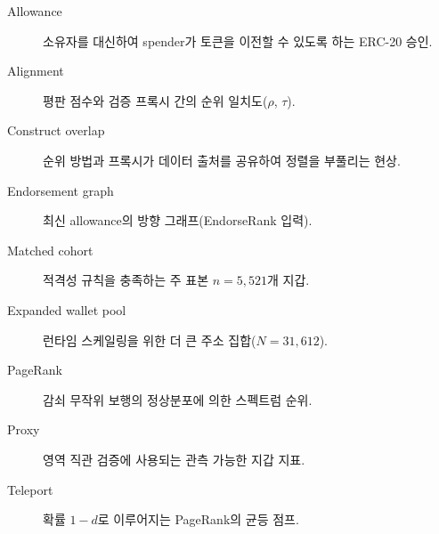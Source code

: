 
\begin{description}
\item[Allowance] 소유자를 대신하여 spender가 토큰을 이전할 수 있도록 하는 ERC-20 승인.
\item[Alignment] 평판 점수와 검증 프록시 간의 순위 일치도($\rho$, $\tau$).
\item[Construct overlap] 순위 방법과 프록시가 데이터 출처를 공유하여 정렬을 부풀리는 현상.
\item[Endorsement graph] 최신 allowance의 방향 그래프(EndorseRank 입력).
\item[Matched cohort] 적격성 규칙을 충족하는 주 표본 $n=5{,}521$개 지갑.
\item[Expanded wallet pool] 런타임 스케일링을 위한 더 큰 주소 집합($N=31{,}612$).
\item[PageRank] 감쇠 무작위 보행의 정상분포에 의한 스펙트럼 순위.
\item[Proxy] 영역 직관 검증에 사용되는 관측 가능한 지갑 지표.
\item[Teleport] 확률 $1-d$로 이루어지는 PageRank의 균등 점프.
\end{description}






